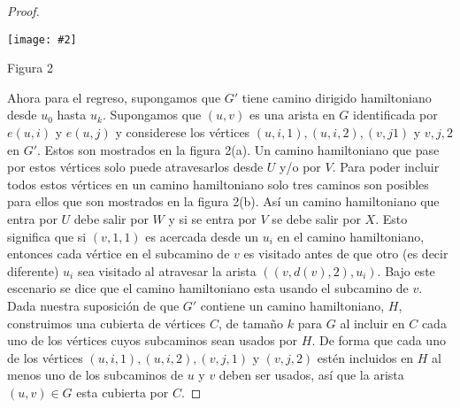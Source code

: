 \documentclass{article}
\newcommand{\jcimage}[2]{\begin{center}\texttt{[image: \#2]}\end{center}\vskip10pt}
\begin{document}
\begin{proof}
  \jcimage{0.7}{figura2-dhp.jpg}{Figura 2}

  Ahora para el regreso, supongamos que $G'$ tiene camino dirigido hamiltoniano desde $u_0$ hasta $u_k$. Supongamos que $(u,v)$ es una arista en $G$ identificada por $e(u,i)$ y $e(u,j)$ y considerese los vértices $(u,i,1),(u,i,2),(v,j1)$ y $v,j,2$ en $G'$. Estos son mostrados en la figura 2(a). Un camino hamiltoniano que pase por estos vértices solo puede atravesarlos desde $U$ y/o por $V$. Para poder incluir todos estos vértices en un camino hamiltoniano solo tres caminos son posibles para ellos que son mostrados en la figura 2(b). Así un camino hamiltoniano que entra por $U$ debe salir por $W$ y si se entra por $V$ se debe salir por $X$. Esto significa que si $(v,1,1)$ es acercada desde un $u_i$ en el camino hamiltoniano, entonces cada vértice en el subcamino de $v$ es visitado antes de que otro (es decir diferente) $u_i$ sea visitado al atravesar la arista $((v,d(v),2), u_i)$. Bajo este escenario se dice que el camino hamiltoniano esta usando el subcamino de $v$. Dada nuestra suposición de que $G'$ contiene un camino hamiltoniano, $H$, construimos una cubierta de vértices $C$, de tamaño $k$ para $G$ al incluir en $C$ cada uno de los vértices cuyos subcaminos sean usados por $H$. De forma que cada uno de los vértices $(u,i,1),(u,i,2),(v,j,1)$ y $(v,j,2)$ estén incluidos en $H$ al menos uno de los subcaminos de $u$ y $v$ deben ser usados, así que la arista $(u,v) \in G$  esta cubierta por $C$.
\end{proof}
\end{document}
